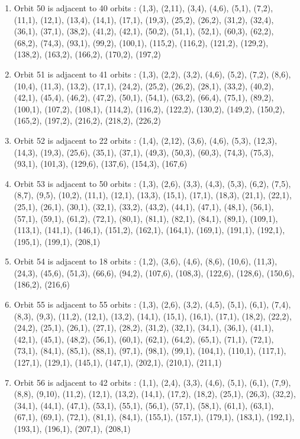 \documentclass[12pt]{article}
\begin{document}
\begin{enumerate}
\item Orbit 50 is adjacent to 40 orbits : (1,3), (2,11), (3,4), (4,6), (5,1), (7,2), (11,1), (12,1), (13,4), (14,1), (17,1), (19,3), (25,2), (26,2), (31,2), (32,4), (36,1), (37,1), (38,2), (41,2), (42,1), (50,2), (51,1), (52,1), (60,3), (62,2), (68,2), (74,3), (93,1), (99,2), (100,1), (115,2), (116,2), (121,2), (129,2), (138,2), (163,2), (166,2), (170,2), (197,2)
\item Orbit 51 is adjacent to 41 orbits : (1,3), (2,2), (3,2), (4,6), (5,2), (7,2), (8,6), (10,4), (11,3), (13,2), (17,1), (24,2), (25,2), (26,2), (28,1), (33,2), (40,2), (42,1), (45,4), (46,2), (47,2), (50,1), (54,1), (63,2), (66,4), (75,1), (89,2), (100,1), (107,2), (108,1), (114,2), (116,2), (122,2), (130,2), (149,2), (150,2), (165,2), (197,2), (216,2), (218,2), (226,2)
\item Orbit 52 is adjacent to 22 orbits : (1,4), (2,12), (3,6), (4,6), (5,3), (12,3), (14,3), (19,3), (25,6), (35,1), (37,1), (49,3), (50,3), (60,3), (74,3), (75,3), (93,1), (101,3), (129,6), (137,6), (154,3), (167,6)
\item Orbit 53 is adjacent to 50 orbits : (1,3), (2,6), (3,3), (4,3), (5,3), (6,2), (7,5), (8,7), (9,5), (10,2), (11,1), (12,1), (13,3), (15,1), (17,1), (18,3), (21,1), (22,1), (25,1), (26,1), (30,1), (32,1), (33,2), (43,2), (44,1), (47,1), (48,1), (56,1), (57,1), (59,1), (61,2), (72,1), (80,1), (81,1), (82,1), (84,1), (89,1), (109,1), (113,1), (141,1), (146,1), (151,2), (162,1), (164,1), (169,1), (191,1), (192,1), (195,1), (199,1), (208,1)
\item Orbit 54 is adjacent to 18 orbits : (1,2), (3,6), (4,6), (8,6), (10,6), (11,3), (24,3), (45,6), (51,3), (66,6), (94,2), (107,6), (108,3), (122,6), (128,6), (150,6), (186,2), (216,6)
\item Orbit 55 is adjacent to 55 orbits : (1,3), (2,6), (3,2), (4,5), (5,1), (6,1), (7,4), (8,3), (9,3), (11,2), (12,1), (13,2), (14,1), (15,1), (16,1), (17,1), (18,2), (22,2), (24,2), (25,1), (26,1), (27,1), (28,2), (31,2), (32,1), (34,1), (36,1), (41,1), (42,1), (45,1), (48,2), (56,1), (60,1), (62,1), (64,2), (65,1), (71,1), (72,1), (73,1), (84,1), (85,1), (88,1), (97,1), (98,1), (99,1), (104,1), (110,1), (117,1), (127,1), (129,1), (145,1), (147,1), (202,1), (210,1), (211,1)
\item Orbit 56 is adjacent to 42 orbits : (1,1), (2,4), (3,3), (4,6), (5,1), (6,1), (7,9), (8,8), (9,10), (11,2), (12,1), (13,2), (14,1), (17,2), (18,2), (25,1), (26,3), (32,2), (34,1), (44,1), (47,1), (53,1), (55,1), (56,1), (57,1), (58,1), (61,1), (63,1), (67,1), (69,1), (72,1), (81,1), (84,1), (155,1), (157,1), (179,1), (183,1), (192,1), (193,1), (196,1), (207,1), (208,1)

\end{enumerate}
\end{document}
